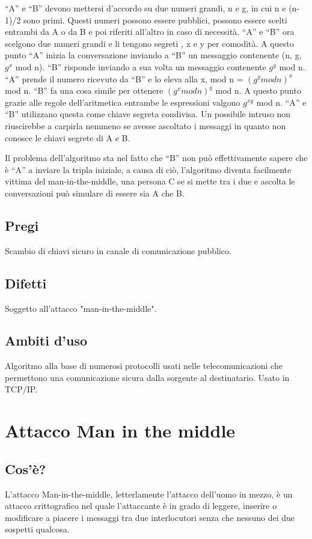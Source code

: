 “A” e “B” devono mettersi d'accordo su due numeri grandi, n e g, in cui n e (n-1)/2 sono primi.
Questi numeri possono essere pubblici, possono essere scelti entrambi da A o da B e poi riferiti all'altro in caso di necessità.
“A” e “B” ora scelgono due numeri grandi e li tengono segreti , x e y per comodità.
A questo punto “A” inizia la conversazione inviando a “B” un messaggio contenente (n, g, $g^x$ mod n).
“B” risponde inviando a sua volta un messaggio contenente $g^y$ mod n. 
“A” prende il numero ricevuto da “B” e lo eleva alla x, mod n = $(g^y mod n)^x$ mod n. “B” fa una cosa simile per ottenere $(g^x mod n)^y$ mod n.
A questo punto grazie alle regole dell'aritmetica entrambe le espressioni valgono $g^{xy}$ mod n. “A” e “B” utilizzano questa come chiave segreta condivisa.
Un possibile intruso non riuscirebbe a carpirla nemmeno se avesse ascoltato i messaggi in quanto non conosce le chiavi segrete di A e B.

Il problema dell'algoritmo sta nel fatto che “B” non può effettivamente sapere che è “A” a inviare la tripla iniziale, a causa di ciò, l'algoritmo diventa facilmente vittima del man-in-the-middle, una persona C se si mette tra i due e ascolta le conversazioni può simulare di essere sia A che B.
\subsection{Pregi}
Scambio di chiavi sicuro in canale di comunicazione pubblico.
\subsection{Difetti}
Soggetto all'attacco "man-in-the-middle".
\subsection{Ambiti d'uso}
Algoritmo alla base di numerosi protocolli usati nelle telecomunicazioni che permettono una comunicazione sicura dalla sorgente al destinatario. Usato in TCP/IP.

\section{Attacco Man in the middle}
\subsection{Cos'è?}
L'attacco Man-in-the-middle, letterlamente l'attacco dell'uomo in mezzo, è un attacco crittografico nel quale l'attaccante è in grado di leggere, inserire o modificare a piacere i messaggi tra due interlocutori senza che nessuno dei due sospetti qualcosa.

